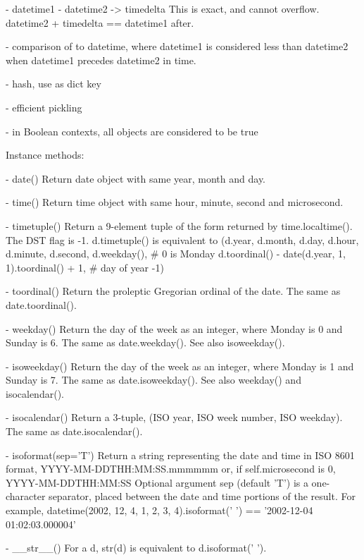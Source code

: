 {    - datetime1 - datetime2 -> timedelta
      This is exact, and cannot overflow.
      datetime2 + timedelta == datetime1 after.

    - comparison of  to datetime, where datetime1 is considered
      less than datetime2 when datetime1 precedes datetime2 in time.

    - hash, use as dict key

    - efficient pickling

    - in Boolean contexts, all  objects are considered to be true

Instance methods:

  - date()
    Return date object with same year, month and day.

  - time()
    Return time object with same hour, minute, second and microsecond.

  - timetuple()
    Return a 9-element tuple of the form returned by time.localtime().
    The DST flag is -1.   d.timetuple() is equivalent to
        (d.year, d.month, d.day,
         d.hour, d.minute, d.second,
         d.weekday(),  # 0 is Monday
         d.toordinal() - date(d.year, 1, 1).toordinal() + 1, # day of year
         -1)

  - toordinal()
    Return the proleptic Gregorian ordinal of the date.  The same as
    date.toordinal().

  - weekday()
    Return the day of the week as an integer, where Monday is 0 and
    Sunday is 6.  The same as date.weekday().
    See also isoweekday().

  - isoweekday()
    Return the day of the week as an integer, where Monday is 1 and
    Sunday is 7.  The same as date.isoweekday().
    See also weekday() and isocalendar().

  - isocalendar()
    Return a 3-tuple, (ISO year, ISO week number, ISO weekday).  The
    same as date.isocalendar().

  - isoformat(sep='T')
    Return a string representing the date and time in ISO 8601 format,
        YYYY-MM-DDTHH:MM:SS.mmmmmm
    or, if self.microsecond is 0,
        YYYY-MM-DDTHH:MM:SS
    Optional argument sep (default 'T') is a one-character separator,
    placed between the date and time portions of the result.  For example,
        datetime(2002, 12, 4, 1, 2, 3, 4).isoformat(' ') ==
        '2002-12-04 01:02:03.000004'

  - __str__()
    For a  d, str(d) is equivalent to d.isoformat(' ').

}
